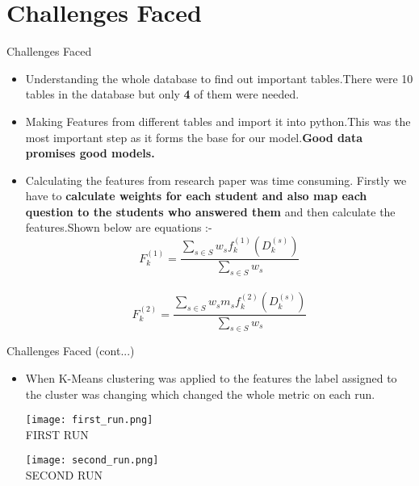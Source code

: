\documentclass[10pt, a4paper]{beamer}
\begin{document}
\section{Challenges Faced}
\begin{frame}{Challenges Faced}
	\begin{itemize}
		
		\item Understanding the whole database to find out important tables.There were 10 tables in the database but only \textbf{4} of them were needed.\\ 
		
		\item Making Features from different tables and import it into python.This was the most important step as it forms the base for our model.\textbf{Good data promises good models.}\\ 
		
		\item Calculating the features from research paper was time consuming. Firstly we have to \textbf{calculate weights for each student and also map each question to the students who answered them} and then calculate the features.Shown below are  equations :- \\
		\begin{equation}
		    F_{k}^{(1)} = \frac{\sum_{s\in S} w_{s} f_{k}^{(1)} (D_{k}^{(s)})}{\sum_{s\in S} w_{s}}
		\end{equation}
		\\
		\begin{equation}
		    F_{k}^{(2)} = \frac{\sum_{s\in S} w_{s} m_{s} f_{k}^{(2)} (D_{k}^{(s)})}{\sum_{s\in S} w_{s}}
		\end{equation}
		
	\end{itemize}
	
\end{frame}
\begin{frame}{Challenges Faced (cont...)}
	\begin{itemize}
		\item When K-Means clustering was applied to the features the label assigned to the cluster was changing which changed the whole metric on each run.\\
		\begin{center}
		\texttt{[image: first\_run.png]}\\
		FIRST RUN
	\end{center}
		\begin{center}
		\texttt{[image: second\_run.png]}\\
		SECOND RUN
	\end{center}
	\end{itemize}
\end{frame}
\end{document}
